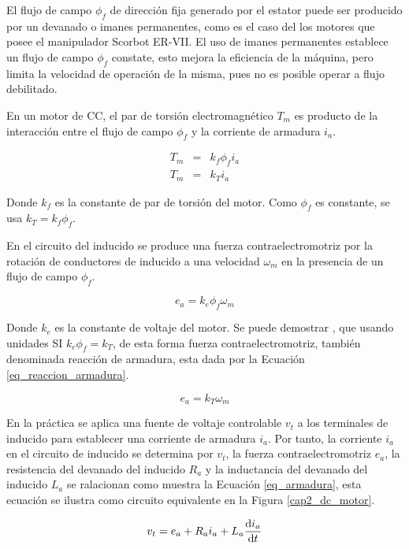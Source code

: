El flujo de campo $\phi_f$ de dirección fija generado por el estator puede ser producido por un devanado o imanes permanentes, como es el caso del los motores que posee el manipulador Scorbot ER-VII. El uso de imanes permanentes establece un flujo de campo $\phi_f$ constate, esto mejora la eficiencia de la máquina, pero limita la velocidad de operación de la misma, pues no es posible operar a flujo debilitado.

En un motor de CC, el par de torsión electromagnético $T_m$ es producto de la interacción entre el flujo de campo $\phi_f$ y la corriente de armadura $i_a$.

\begin{eqnarray}
T_m &=& k_f \phi_f i_a \\
T_m &=& k_T i_a
\end{eqnarray}

Donde $k_f$ es la constante de par de torsión del motor. Como $\phi_f$ es constante, se usa $k_T= k_f \phi_f$.

En el circuito del inducido se produce una fuerza contraelectromotriz por la rotación de conductores de inducido a una velocidad $\omega_m$ en la presencia de un flujo de campo $\phi_f$.

\begin{equation}
e_a = k_e \phi_f \omega_m
\end{equation}

Donde $k_e$ es la constante de voltaje del motor. Se puede demostrar \cite{mohan}, que usando unidades SI $k_e \phi_f = k_T$, de esta forma fuerza contraelectromotriz, también denominada reacción de armadura, esta dada por la Ecuación \ref{eq_reaccion_armadura}.

\begin{equation}\label{eq_reaccion_armadura}
e_a = k_T \omega_m
\end{equation}

En la práctica se aplica una fuente de voltaje controlable $v_t$ a los terminales de inducido para establecer una corriente de armadura $i_a$. Por tanto, la corriente $i_a$ en el circuito de inducido se determina por $v_t$, la fuerza contraelectromotriz $e_a$, la resistencia del devanado del inducido $R_a$ y la inductancia del devanado del inducido $L_a$ se ralacionan como muestra la Ecuación \ref{eq_armadura}, esta ecuación se ilustra como circuito equivalente en la Figura \ref{cap2_dc_motor}.

\begin{equation}\label{eq_armadura}
v_t = e_a + R_a i_a + L_a \dv{i_a}{t}
\end{equation}

